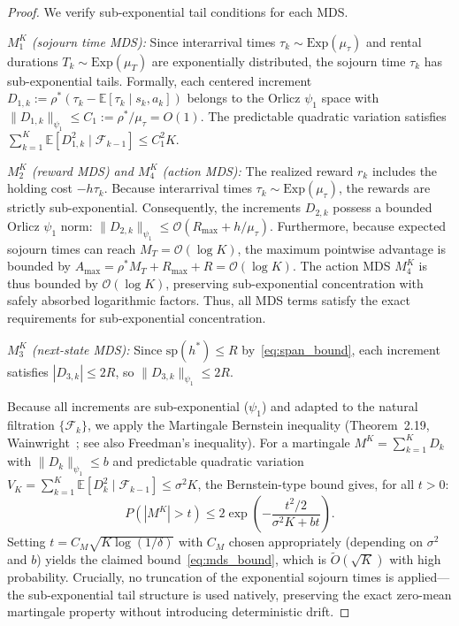 \documentclass[letterpaper, 10 pt, conference]{IEEEconf}
\newcommand{\E}{\mathbb{E}}
\begin{document}
\begin{proof}
    We verify sub-exponential tail conditions for each MDS.

    \emph{$M_1^K$ (sojourn time MDS):} Since interarrival times $\tau_k \sim \mathrm{Exp}(\mu_\tau)$ and rental durations $T_k \sim \mathrm{Exp}(\mu_T)$ are exponentially distributed, the sojourn time $\tau_k$ has sub-exponential tails. Formally, each centered increment $D_{1,k} := \rho^*(\tau_k - \E[\tau_k \mid s_k, a_k])$ belongs to the Orlicz $\psi_1$ space with $\|D_{1,k}\|_{\psi_1} \leq C_1 := \rho^* / \mu_\tau = O(1)$. The predictable quadratic variation satisfies $\sum_{k=1}^K \E[D_{1,k}^2 \mid \mathcal{F}_{k-1}] \leq C_1^2 K$.

    \emph{$M_2^K$ (reward MDS) and $M_4^K$ (action MDS):} The realized reward $r_k$ includes the holding cost $-h \tau_k$. Because interarrival times $\tau_k \sim \mathrm{Exp}(\mu_\tau)$, the rewards are strictly sub-exponential. Consequently, the increments $D_{2,k}$ possess a bounded Orlicz $\psi_1$ norm: $\|D_{2,k}\|_{\psi_1} \leq \mathcal{O}(R_{\max} + h/\mu_\tau)$. Furthermore, because expected sojourn times can reach $M_T = \mathcal{O}(\log K)$, the maximum pointwise advantage is bounded by $A_{\max} = \rho^* M_T + R_{\max} + R = \mathcal{O}(\log K)$. The action MDS $M_4^K$ is thus bounded by $\mathcal{O}(\log K)$, preserving sub-exponential concentration with safely absorbed logarithmic factors. Thus, all MDS terms satisfy the exact requirements for sub-exponential concentration.

    \emph{$M_3^K$ (next-state MDS):} Since $\mathrm{sp}(h^*) \leq R$ by~\eqref{eq:span_bound}, each increment satisfies $|D_{3,k}| \leq 2R$, so $\|D_{3,k}\|_{\psi_1} \leq 2R$.

    Because all increments are sub-exponential ($\psi_1$) and adapted to the natural filtration $\{\mathcal{F}_k\}$, we apply the Martingale Bernstein inequality (Theorem~2.19, Wainwright~\cite{wainwright2019}; see also Freedman's inequality). For a martingale $M^K = \sum_{k=1}^K D_k$ with $\|D_k\|_{\psi_1} \leq b$ and predictable quadratic variation $V_K = \sum_{k=1}^K \E[D_k^2 \mid \mathcal{F}_{k-1}] \leq \sigma^2 K$, the Bernstein-type bound gives, for all $t > 0$:
    \begin{equation}
        P(|M^K| > t) \leq 2\exp\!\left(-\frac{t^2/2}{\sigma^2 K + bt}\right).
    \end{equation}
    Setting $t = C_M\sqrt{K\log(1/\delta)}$ with $C_M$ chosen appropriately (depending on $\sigma^2$ and $b$) yields the claimed bound~\eqref{eq:mds_bound}, which is $\widetilde{O}(\sqrt{K})$ with high probability. Crucially, no truncation of the exponential sojourn times is applied---the sub-exponential tail structure is used natively, preserving the exact zero-mean martingale property without introducing deterministic drift.
\end{proof}
\end{document}
